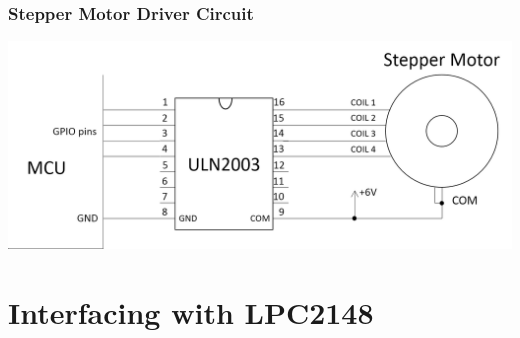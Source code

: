 \documentclass[table,10pt,red]{beamer}	%
\begin{document}
\begin{frame}
	\frametitle{Stepper Motor Driver Circuit}
	\begin{center}
		\includegraphics[width=\linewidth]{Driver}
	\end{center}
\end{frame}

\section{Interfacing with LPC2148}
\end{document}
